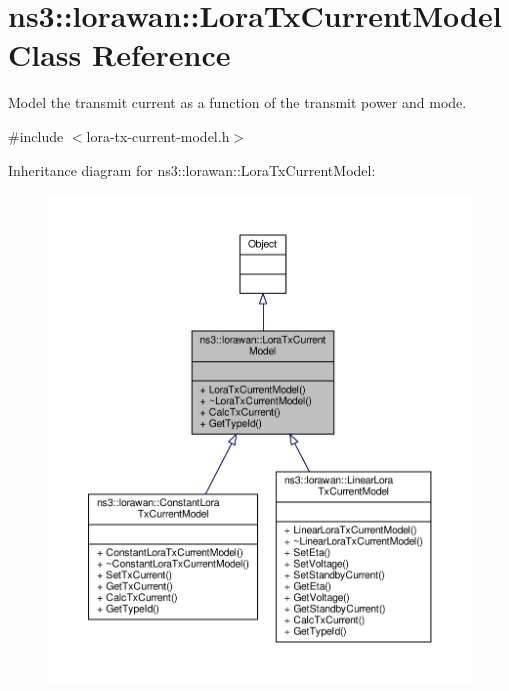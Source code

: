 \hypertarget{classns3_1_1lorawan_1_1LoraTxCurrentModel}{}\section{ns3\+:\+:lorawan\+:\+:Lora\+Tx\+Current\+Model Class Reference}
\label{classns3_1_1lorawan_1_1LoraTxCurrentModel}


Model the transmit current as a function of the transmit power and mode.  




{\ttfamily \#include $<$lora-\/tx-\/current-\/model.\+h$>$}



Inheritance diagram for ns3\+:\+:lorawan\+:\+:Lora\+Tx\+Current\+Model\+:
\nopagebreak
\begin{figure}[H]
\begin{center}
\leavevmode
\includegraphics[width=350pt]{classns3_1_1lorawan_1_1LoraTxCurrentModel__inherit__graph}
\end{center}
\end{figure}


